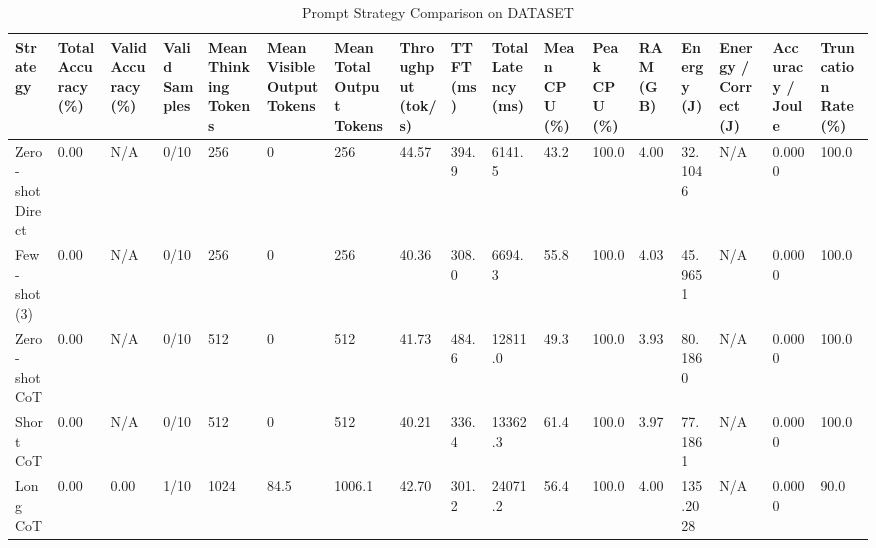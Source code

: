 \begin{table}
\caption{Prompt Strategy Comparison on DATASET}
\label{tab:strategy_comparison}
\begin{tabular}{lllllllllllllllll}
\toprule
Strategy & Total Accuracy (\%) & Valid Accuracy (\%) & Valid Samples & Mean Thinking Tokens & Mean Visible Output Tokens & Mean Total Output Tokens & Throughput (tok/s) & TTFT (ms) & Total Latency (ms) & Mean CPU (\%) & Peak CPU (\%) & RAM (GB) & Energy (J) & Energy / Correct (J) & Accuracy / Joule & Truncation Rate (\%) \\
\midrule
Zero-shot Direct & 0.00 & N/A & 0/10 & 256 & 0 & 256 & 44.57 & 394.9 & 6141.5 & 43.2 & 100.0 & 4.00 & 32.1046 & N/A & 0.0000 & 100.0 \\
Few-shot (3) & 0.00 & N/A & 0/10 & 256 & 0 & 256 & 40.36 & 308.0 & 6694.3 & 55.8 & 100.0 & 4.03 & 45.9651 & N/A & 0.0000 & 100.0 \\
Zero-shot CoT & 0.00 & N/A & 0/10 & 512 & 0 & 512 & 41.73 & 484.6 & 12811.0 & 49.3 & 100.0 & 3.93 & 80.1860 & N/A & 0.0000 & 100.0 \\
Short CoT & 0.00 & N/A & 0/10 & 512 & 0 & 512 & 40.21 & 336.4 & 13362.3 & 61.4 & 100.0 & 3.97 & 77.1861 & N/A & 0.0000 & 100.0 \\
Long CoT & 0.00 & 0.00 & 1/10 & 1024 & 84.5 & 1006.1 & 42.70 & 301.2 & 24071.2 & 56.4 & 100.0 & 4.00 & 135.2028 & N/A & 0.0000 & 90.0 \\
\bottomrule
\end{tabular}
\end{table}
